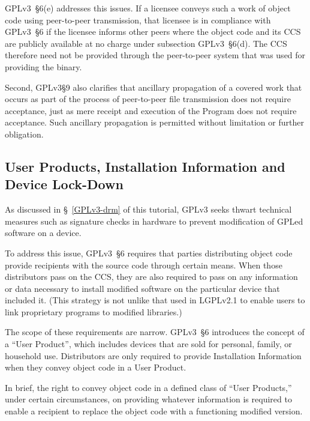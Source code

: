 GPLv3~\S6(e) addresses this issues.  If a licensee conveys such a work of
object code using peer-to-peer transmission, that licensee is in compliance
with GPLv3~\S6 if the licensee informs other peers where the object code and
its CCS are publicly available at no charge under subsection GPLv3~\S6(d).
The CCS therefore need not be provided through the peer-to-peer system that
was used for providing the binary.

Second, GPLv3\S9 also clarifies that ancillary propagation of a covered work
that occurs as part of the process of peer-to-peer file transmission does not
require acceptance, just as mere receipt and execution of the Program does
not require acceptance.  Such ancillary propagation is permitted without
limitation or further obligation.


\subsection{User Products, Installation Information and Device Lock-Down}

As discussed in \S~\ref{GPLv3-drm} of this tutorial, GPLv3 seeks thwart
technical measures such as signature checks in hardware to prevent
modification of GPLed software on a device.

To address this issue, GPLv3~\S6 requires that parties distributing object
code provide recipients with the source code through certain means.  When
those distributors pass on the CCS, they are also required to pass on any
information or data necessary to install modified software on the particular
device that included it.  (This strategy is not unlike that used in LGPLv2.1
to enable users to link proprietary programs to modified libraries.)


\label{user-product}

The scope of these requirements are narrow.  GPLv3~\S6 introduces the concept
of a ``User Product'', which includes devices that are sold for personal,
family, or household use.  Distributors are only required to provide
Installation Information when they convey object code in a User Product.

In brief, the right to convey object code in a defined class of ``User
Products,'' under certain circumstances, on providing whatever information is
required to enable a recipient to replace the object code with a functioning
modified version.


